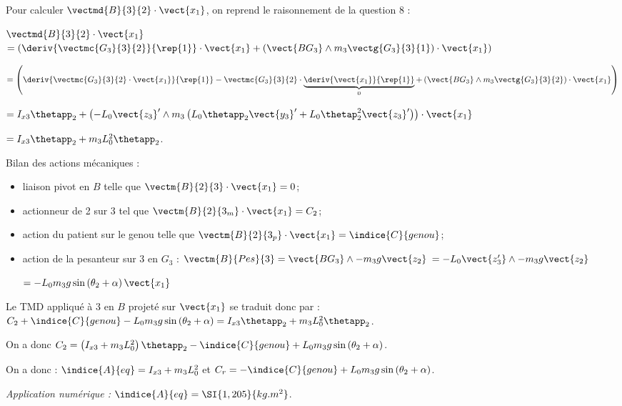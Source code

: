 \ifprof\begin{corrige}

Pour calculer $\vectmd{B}{3}{2} \cdot \vect{x_1}$, on reprend le raisonnement de la question 8 :  

 $\vectmd{B}{3}{2} \cdot \vect{x_1}$  
$= \left(\deriv{\vectmc{G_3}{3}{2}}{\rep{1}} \cdot \vect{x_1} + \left(\vect{BG_3} \wedge m_3 \vectg{G_3}{3}{1}\right)\cdot \vect{x_1} \right)  $

$= \left(\deriv{\vectmc{G_3}{3}{2}\cdot \vect{x_1}}{\rep{1}} - \vectmc{G_3}{3}{2}\cdot \underbrace{\deriv{ \vect{x_1}}{\rep{1}}}_{0}   + \left(\vect{BG_3} \wedge m_3 \vectg{G_3}{3}{2}\right)\cdot \vect{x_1} \right)  $

$=I_{x3}\thetapp_2 +\left( -L_0 \vect{z_3}'	 \wedge m_3  \left( L_0 \thetapp_2 \vect{y_3}' +L_0 \thetap_2^2 \vect{z_3}' \right)\right)\cdot \vect{x_1}$


$=I_{x3}\thetapp_2 + m_3 L_0^2 \thetapp_2  $.

Bilan des actions mécaniques : 
\begin{itemize}
\item liaison pivot en $B$ telle que $\vectm{B}{2}{3}\cdot \vect{x_1} = 0$;
\item actionneur de 2 sur 3 tel que  $\vectm{B}{2}{3_m}\cdot \vect{x_1} = C_2$;
\item action du patient sur le genou telle que  $\vectm{B}{2}{3_p}\cdot \vect{x_1} = \indice{C}{genou}$;
\item action de la pesanteur sur 3 en $G_3$ : $\vectm{B}{Pes}{3} = \vect{BG_3}\wedge -m_3 g\vect{z_2}$ $= -L_0 \vect{z_3'}\wedge -m_3 g\vect{z_2}$

$= - L_0 m_3 g \sin\left(\theta_2 + \alpha\right)\vect{x_1}$
\end{itemize}

Le TMD appliqué à 3 en $B$ projeté sur $\vect{x_1}$ se traduit donc par : 
$C_2 +\indice{C}{genou} - L_0 m_3 g \sin\left(\theta_2 + \alpha\right)=I_{x3}\thetapp_2 + m_3 L_0^2 \thetapp_2  $.

On a donc $C_2 = \left( I_{x3} + m_3 L_0^2 \right)\thetapp_2  - \indice{C}{genou} + L_0 m_3 g \sin\left(\theta_2 + \alpha\right) $.

On a donc : $\indice{A}{eq} = I_{x3} + m_3 L_0^2$ et $C_r =  - \indice{C}{genou} + L_0 m_3 g \sin\left(\theta_2 + \alpha\right)$.


\textit{Application numérique :} $\indice{A}{eq} =\SI{1,205}{kg.m^2}$.

\end{corrige}\else\fi


